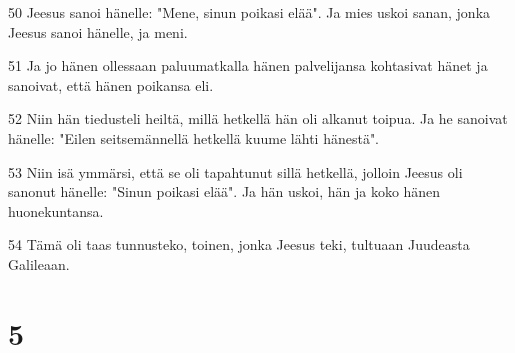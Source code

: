 \par 50 Jeesus sanoi hänelle: "Mene, sinun poikasi elää". Ja mies uskoi sanan, jonka Jeesus sanoi hänelle, ja meni.
\par 51 Ja jo hänen ollessaan paluumatkalla hänen palvelijansa kohtasivat hänet ja sanoivat, että hänen poikansa eli.
\par 52 Niin hän tiedusteli heiltä, millä hetkellä hän oli alkanut toipua. Ja he sanoivat hänelle: "Eilen seitsemännellä hetkellä kuume lähti hänestä".
\par 53 Niin isä ymmärsi, että se oli tapahtunut sillä hetkellä, jolloin Jeesus oli sanonut hänelle: "Sinun poikasi elää". Ja hän uskoi, hän ja koko hänen huonekuntansa.
\par 54 Tämä oli taas tunnusteko, toinen, jonka Jeesus teki, tultuaan Juudeasta Galileaan.

\chapter{5}

